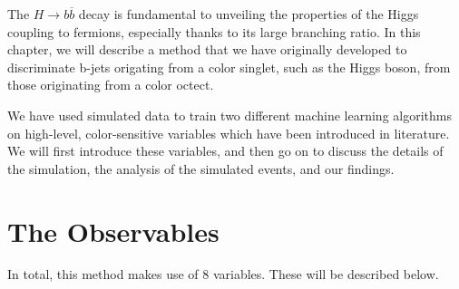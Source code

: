 \documentclass[10pt,a4paper]{book}
\begin{document}
The $H\rightarrow b\overline{b}$ decay is fundamental to unveiling the properties of the Higgs coupling to fermions, especially thanks to its large branching ratio. In this chapter, we will describe a method that we have originally developed to discriminate b-jets origating from a color singlet, such as the Higgs boson, from those originating from a color octect. 

We have used simulated data to train two different machine learning algorithms on high-level, color-sensitive variables which have been introduced in literature. We will first introduce these variables, and then go on to discuss the details of the simulation, the analysis of the simulated events, and our findings.

\section{The Observables}
In total, this method makes use of 8 variables. These will be described below. 
\end{document}
